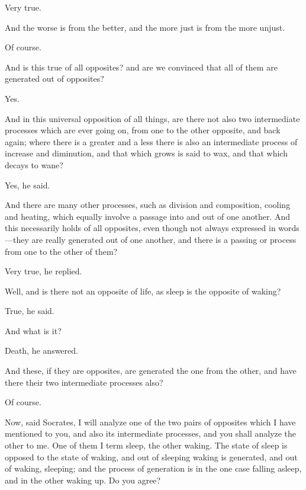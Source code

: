 \documentclass[11pt,letter]{article}
\begin{document}
\par  Very true.

\par  And the worse is from the better, and the more just is from the more unjust.

\par  Of course.

\par  And is this true of all opposites? and are we convinced that all of them are generated out of opposites?

\par  Yes.

\par  And in this universal opposition of all things, are there not also two intermediate processes which are ever going on, from one to the other opposite, and back again; where there is a greater and a less there is also an intermediate process of increase and diminution, and that which grows is said to wax, and that which decays to wane?

\par  Yes, he said.

\par  And there are many other processes, such as division and composition, cooling and heating, which equally involve a passage into and out of one another. And this necessarily holds of all opposites, even though not always expressed in words—they are really generated out of one another, and there is a passing or process from one to the other of them?

\par  Very true, he replied.

\par  Well, and is there not an opposite of life, as sleep is the opposite of waking?

\par  True, he said.

\par  And what is it?

\par  Death, he answered.

\par  And these, if they are opposites, are generated the one from the other, and have there their two intermediate processes also?

\par  Of course.

\par  Now, said Socrates, I will analyze one of the two pairs of opposites which I have mentioned to you, and also its intermediate processes, and you shall analyze the other to me. One of them I term sleep, the other waking. The state of sleep is opposed to the state of waking, and out of sleeping waking is generated, and out of waking, sleeping; and the process of generation is in the one case falling asleep, and in the other waking up. Do you agree?
\end{document}
